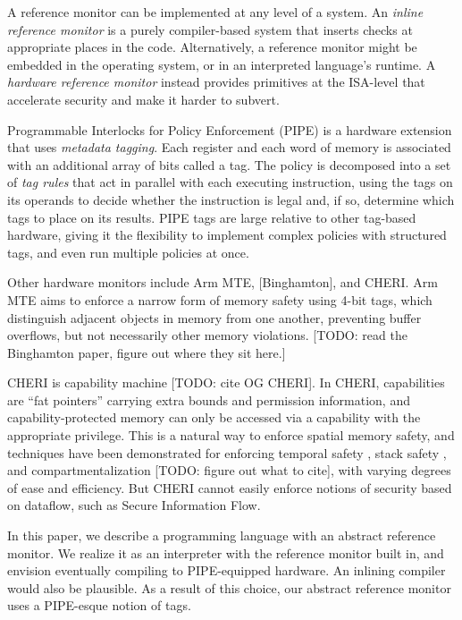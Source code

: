 \documentclass{llncs}
\begin{document}
A reference monitor can be implemented at any level of a system. An {\em inline reference monitor}
is a purely compiler-based system that inserts checks at appropriate places in the code.
Alternatively, a reference monitor might be embedded in the operating system, or in an interpreted
language's runtime. A {\em hardware reference monitor} instead provides primitives at the ISA-level
that accelerate security and make it harder to subvert.

Programmable Interlocks for Policy Enforcement (PIPE) \cite{Dhawan14:PUMP} is a hardware extension
that uses {\em metadata tagging}. Each register and each word of memory is associated with
an additional array of bits called a tag. The policy is decomposed into a set of {\em tag rules}
that act in parallel with each executing instruction, using the tags on its operands to
decide whether the instruction is legal and, if so, determine which tags to place on its results.
PIPE tags are large relative to other tag-based hardware, giving it the flexibility
to implement complex policies with structured tags, and even run multiple policies at once.

Other hardware monitors include Arm MTE, [Binghamton], and CHERI.
Arm MTE aims to enforce a narrow form of memory safety using 4-bit tags, which distinguish adjacent objects
in memory from one another, preventing buffer overflows, but not necessarily other memory violations.
[TODO: read the Binghamton paper, figure out where they sit here.] 

CHERI is capability machine [TODO: cite OG CHERI]. In CHERI, capabilities
are ``fat pointers'' carrying extra bounds and permission information, and capability-protected
memory can only be accessed via a capability with the appropriate privilege. This is a natural
way to enforce spatial memory safety, and techniques have been demonstrated for enforcing
temporal safety \cite{NWF20:Cornucopia}, stack safety \cite{Skorstengaard19:stktokens},
and compartmentalization [TODO: figure out what to cite], with varying degrees of ease and
efficiency. But CHERI cannot easily enforce notions of security based on dataflow,
such as Secure Information Flow.

In this paper, we describe a programming language with an abstract reference monitor.
We realize it as an interpreter with the reference monitor built in, and envision
eventually compiling to PIPE-equipped hardware. An inlining compiler would also be plausible.
As a result of this choice, our abstract reference monitor uses a PIPE-esque notion of
tags.
\end{document}
